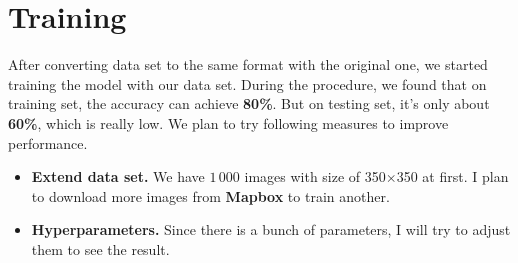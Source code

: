 \documentclass[journal，a4paper]{IEEEtran}
\begin{document}
\section{Training}
	After converting data set to the same format with the original one, we started training the model with our data set. During the procedure, we found that on training set, the accuracy can achieve \textbf{80\%}. But on testing set, it's only about \textbf{60\%}, which is really low. We plan to try following measures to improve performance.
	\begin{itemize}
		\item \textbf{Extend data set.} We have $1\,000$ images with size of 350$\times$350 at first. I plan to download more images from \textbf{Mapbox} to train another.
		\item \textbf{Hyperparameters.} Since there is a bunch of parameters, I will try to adjust them to see the result. 
	\end{itemize}


	


\end{document}
